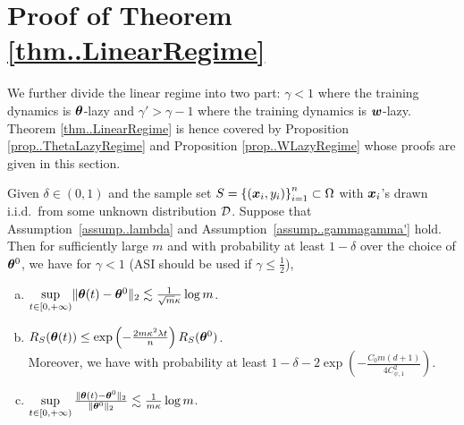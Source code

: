 \documentclass{article}
\begin{document}
\section{Proof of Theorem \ref{thm..LinearRegime}}
We further divide the linear regime into two part: $\gamma<1$ where the training dynamics is $\bm{\theta}$-lazy and $\gamma'>\gamma-1$ where the training dynamics is $\bm{w}$-lazy. Theorem \ref{thm..LinearRegime} is hence covered by Proposition \ref{prop..ThetaLazyRegime} and Proposition \ref{prop..WLazyRegime} whose proofs are given in this section.
\begin{prop}\label{prop..ThetaLazyRegime}
    Given $\delta\in(0,1)$ and the sample set $S = {\{(\bm{x}_i, y_i)\}}_{i=1}^n\subset\Omega$ with $\bm{x}_i$'s drawn i.i.d.\ from some unknown distribution $\mathcal{D}$. Suppose that Assumption~\ref{assump..lambda} and Assumption~\ref{assump..gammagamma'} hold. Then for sufficiently large $m$ and with probability at least $1-\delta$ over the choice of $\bm{\theta}^0$, we have for $\gamma<1$ (ASI should be used if $\gamma\leq\frac{1}{2}$),
    \begin{enumerate}[(a)]
        \item $\sup\limits_{t\in[0,+\infty)}\lVert\bm{\theta}(t)-\bm{\theta}^0\rVert_2\lesssim\frac{1}{\sqrt{m}\kappa}\log m$.
        \item $R_S(\bm{\theta}(t))\leq \exp\left(-\frac{2m\kappa^2\lambda t}{n}\right)R_S(\bm{\theta}^0)$. \\
              Moreover, we have with probability at least $1-\delta-2\exp\left(-\frac{C_0m(d+1)}{4C^2_{\psi,1}}\right)$.
        \item $\sup\limits_{t\in[0,+\infty)}\frac{\lVert\bm{\theta}(t)-\bm{\theta}^0\rVert_2}{\lVert\bm{\theta}^0\rVert_2}\lesssim\frac{1}{m\kappa}\log m$.
    \end{enumerate}
\end{prop}
\end{document}
